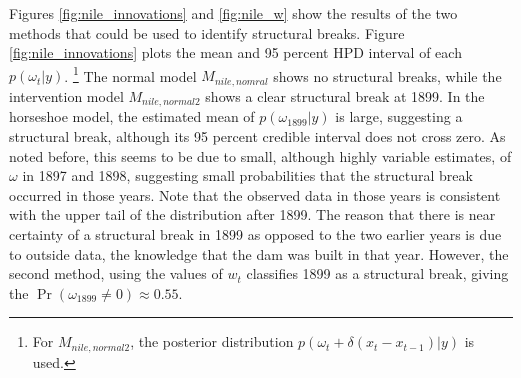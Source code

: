 \documentclass{article}
\DeclareMathOperator{\E}{E}
\begin{document}
\begin{itemize}
Figures \ref{fig:nile_innovations} and \ref{fig:nile_w} show the results of the two methods that could be used to identify structural breaks. 
Figure \ref{fig:nile_innovations} plots the mean and 95 percent HPD interval of each $p(\omega_{t} | y)$.%
\footnote{For $M_{nile,normal2}$, the posterior distribution $p(\omega_{t} + \delta (x_{t} - x_{t-1}) | y)$ is used.}
The normal model $M_{nile,nomral}$ shows no structural breaks, while the intervention model $M_{nile,normal2}$ shows a clear structural break at 1899.
In the horseshoe model, the estimated mean of $p(\omega_{1899} | y)$ is large, suggesting a structural break, although its 95 percent credible interval does not cross zero.
As noted before, this seems to be due to small, although highly variable estimates, of $\omega$ in 1897 and 1898, suggesting small probabilities that the structural break occurred in those years.
Note that the observed data in those years is consistent with the upper tail of the distribution after 1899.
The reason that there is near certainty of a structural break in 1899 as opposed to the two earlier years is due to outside data, the knowledge that the dam was built in that year.
However, the second method, using the values of $w_{t}$ classifies 1899 as a structural break, giving the $\Pr(\omega_{1899} \neq 0) \approx 0.55$.




%   


\end{itemize}
\end{document}
